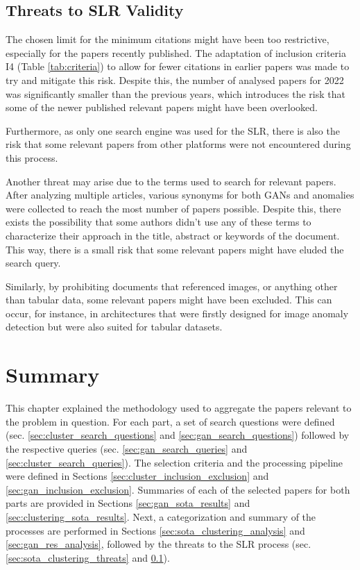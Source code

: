 \subsection{Threats to SLR Validity}\label{sec:gan_slr_threats}
The chosen limit for the minimum citations might have been too restrictive, especially for the papers recently published. The adaptation of inclusion criteria I4 (Table \ref{tab:criteria}) to allow for fewer citations in earlier papers was made to try and mitigate this risk. Despite this, the number of analysed papers for 2022 was significantly smaller than the previous years, which introduces the risk that some of the newer published relevant papers might have been overlooked. 

Furthermore, as only one search engine was used for the SLR, there is also the risk that some relevant papers from other platforms were not encountered during this process. 

Another threat may arise due to the terms used to search for relevant papers. After analyzing multiple articles, various synonyms for both GANs and anomalies were collected to reach the most number of papers possible. Despite this, there exists the possibility that some authors didn't use any of these terms to characterize their approach in the title, abstract or keywords of the document. This way, there is a small risk that some relevant papers might have eluded the search query.

Similarly, by prohibiting documents that referenced images, or anything other than tabular data, some relevant papers might have been excluded. This can occur, for instance, in architectures that were firstly designed for image anomaly detection but were also suited for tabular datasets.

\section{Summary}\label{sec:summary}
This chapter explained the methodology used to aggregate the papers relevant to the problem in question. For each part, a set of search questions were defined (sec. \ref{sec:cluster_search_questions} and \ref{sec:gan_search_questions}) followed by the respective queries (sec. \ref{sec:gan_search_queries} and \ref{sec:cluster_search_queries}). The selection criteria and the processing pipeline were defined in Sections \ref{sec:cluster_inclusion_exclusion} and \ref{sec:gan_inclusion_exclusion}. Summaries of each of the selected papers for both parts are provided in Sections \ref{sec:gan_sota_results} and \ref{sec:clustering_sota_results}. Next, a categorization and summary of the processes are performed in Sections \ref{sec:sota_clustering_analysis} and \ref{sec:gan_res_analysis}, followed by the threats to the SLR process (sec. \ref{sec:sota_clustering_threats} and \ref{sec:gan_slr_threats}).

